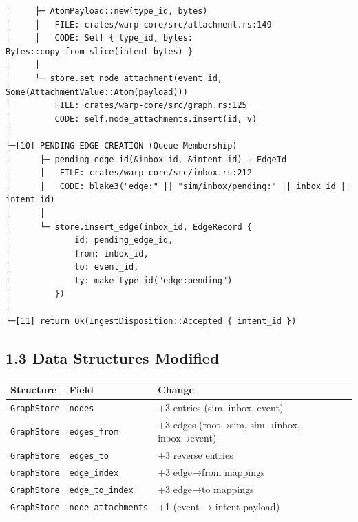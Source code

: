 \documentclass[
]{book}
\newcounter{none} %
\begin{document}
\begin{verbatim}
│     ├─ AtomPayload::new(type_id, bytes)
│     │   FILE: crates/warp-core/src/attachment.rs:149
│     │   CODE: Self { type_id, bytes: Bytes::copy_from_slice(intent_bytes) }
│     │
│     └─ store.set_node_attachment(event_id, Some(AttachmentValue::Atom(payload)))
│         FILE: crates/warp-core/src/graph.rs:125
│         CODE: self.node_attachments.insert(id, v)
│
├─[10] PENDING EDGE CREATION (Queue Membership)
│      ├─ pending_edge_id(&inbox_id, &intent_id) → EdgeId
│      │   FILE: crates/warp-core/src/inbox.rs:212
│      │   CODE: blake3("edge:" || "sim/inbox/pending:" || inbox_id || intent_id)
│      │
│      └─ store.insert_edge(inbox_id, EdgeRecord {
│             id: pending_edge_id,
│             from: inbox_id,
│             to: event_id,
│             ty: make_type_id("edge:pending")
│         })
│
└─[11] return Ok(IngestDisposition::Accepted { intent_id })
\end{verbatim}

\subsection{1.3 Data Structures
Modified}\label{data-structures-modified}

{\def\LTcaptype{none} %
\begin{longtable}[]{@{}
  >{\raggedright\arraybackslash}p{}
  >{\raggedright\arraybackslash}p{}
  >{\raggedright\arraybackslash}p{}@{}}
\toprule\noalign{}
\begin{minipage}[b]{\linewidth}\raggedright
Structure
\end{minipage} & \begin{minipage}[b]{\linewidth}\raggedright
Field
\end{minipage} & \begin{minipage}[b]{\linewidth}\raggedright
Change
\end{minipage} \\
\midrule\noalign{}
\endhead
\bottomrule\noalign{}
\endlastfoot
\texttt{GraphStore} & \texttt{nodes} & +3 entries (sim, inbox, event) \\
\texttt{GraphStore} & \texttt{edges\_from} & +3 edges (root→sim,
sim→inbox, inbox→event) \\
\texttt{GraphStore} & \texttt{edges\_to} & +3 reverse entries \\
\texttt{GraphStore} & \texttt{edge\_index} & +3 edge→from mappings \\
\texttt{GraphStore} & \texttt{edge\_to\_index} & +3 edge→to mappings \\
\texttt{GraphStore} & \texttt{node\_attachments} & +1 (event → intent
payload) \\
\end{longtable}
}
\end{document}
